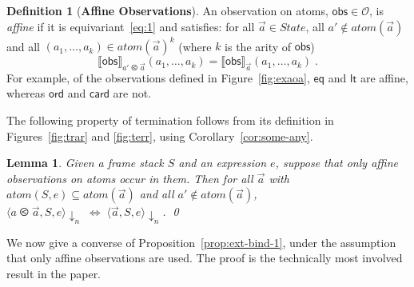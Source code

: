 \documentclass{LMCS}
\theoremstyle{plain}
\newtheorem{lemma}[thm]{Lemma}
\theoremstyle{definition}
\newtheorem{definition}[thm]{Definition}
\newcommand{\atm}[1][a]{#1}
\newcommand{\atoms}{\mathit{atom}}
\newcommand{\bimp}{\Leftrightarrow}
\newcommand{\config}[3]{\langle#1, #2, #3\rangle}
\newcommand{\den}[1]{\llbracket#1\rrbracket}\newcommand{\DIVERGE}{\kw{diverge}}
\renewcommand{\exp}[1][e]{#1}
\newcommand{\LP}{\mathopen{\kw{(}}}
\newcommand{\kw}[1]{\mathsf{#1}}
\newcommand{\Obs}{\mathcal{O}}
\newcommand{\OBS}[1][obs]{\kw{#1}}
\newcommand{\ords}{\olessthan}\newcommand{\PAIR}[2]{\LP#1\mathbin{\kw{,}}#2\RP}
\newcommand{\RP}{\mathclose{\kw{)}}}
\newcommand{\State}{\mathit{State}}
\newcommand{\s}[1][a]{\vec{#1}}
\newcommand{\stk}[1][S]{#1}
\newcommand{\terminates}[1][]{{\downarrow_{#1}}}
\begin{document}
\begin{definition}[\textbf{Affine Observations}]
  \label{def:affo}
  An observation on atoms, $\OBS\in\Obs$, is \emph{affine} if it is
  equivariant~\eqref{eq:1} and satisfies: for all $\s\in\State$, all
  $\atm'\notin\atoms(\s)$ and all
  $(\atm_1,\ldots,\atm_k)\in\atoms(\s)^k$ (where $k$ is the arity of
  $\OBS$)
  \begin{equation}
    \label{eq:16}
    \den{\OBS}_{\atm'\ords\s}(\atm_1,\ldots,\atm_k) 
    = \den{\OBS}_{\s}(\atm_1,\ldots,\atm_k)\;. 
  \end{equation}
  For example, of the observations defined in Figure~\ref{fig:exaoa},
  $\OBS[eq]$ and $\OBS[lt]$ are affine, whereas $\OBS[ord]$ and
  $\OBS[card]$ are not.
\end{definition}

The following property of termination follows from its definition in
Figures~\ref{fig:trar} and \ref{fig:terr}, using
Corollary~\ref{cor:some-any}.

\begin{lemma}
  \label{lem:affo}
  Given a frame stack $\stk$ and an expression $\exp$, suppose that
  only affine observations on atoms occur in them. Then for all $\s$
  with $\atoms(\stk,\exp)\subseteq\atoms(\s)$ and all
  $\atm'\notin\atoms(\s)$,
  $\config{\atm\ords\s}{\stk}{\exp}\terminates[n] \;\bimp\;
  \config{\s}{\stk}{\exp}\terminates[n]$. \qed
\end{lemma}

We now give a converse of Proposition~\ref{prop:ext-bind-1}, under the
assumption that only affine observations are used. The proof is the
technically most involved result in the paper.
\end{document}
